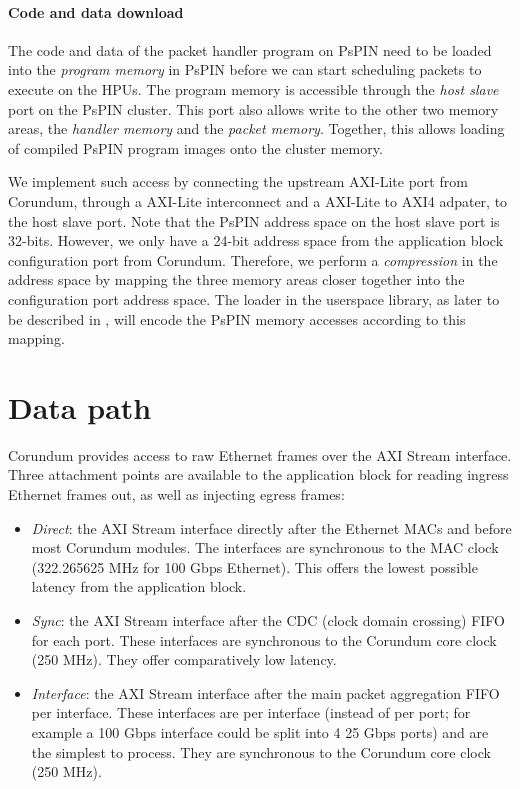 \paragraph{Code and data download} The code and data of the packet handler program on PsPIN need to be loaded into the \emph{program memory} in PsPIN before we can start scheduling packets to execute on the HPUs.  The program memory is accessible through the \emph{host slave} port on the PsPIN cluster.  This port also allows write to the other two memory areas, the \emph{handler memory} and the \emph{packet memory}.  Together, this allows loading of compiled PsPIN program images onto the cluster memory.

We implement such access by connecting the upstream AXI-Lite port from Corundum, through a AXI-Lite interconnect and a AXI-Lite to AXI4 adpater, to the host slave port.  Note that the PsPIN address space on the host slave port is 32-bits.  However, we only have a 24-bit address space from the application block configuration port from Corundum.  Therefore, we perform a \emph{compression} in the address space by mapping the three memory areas closer together into the configuration port address space.  The loader in the userspace library, as later to be described in , will encode the PsPIN memory accesses according to this mapping.

\section{Data path}

Corundum provides access to raw Ethernet frames over the AXI Stream interface.  Three attachment points are available to the application block for reading ingress Ethernet frames out, as well as injecting egress frames:

\begin{itemize}
    \item \emph{Direct}: the AXI Stream interface directly after the Ethernet MACs and before most Corundum modules.  The interfaces are synchronous to the MAC clock (322.265625 MHz for 100 Gbps Ethernet).  This offers the lowest possible latency from the application block.
    \item \emph{Sync}: the AXI Stream interface after the CDC (clock domain crossing) FIFO for each port.  These interfaces are synchronous to the Corundum core clock (250 MHz).  They offer comparatively low latency.
    \item \emph{Interface}: the AXI Stream interface after the main packet aggregation FIFO per interface.  These interfaces are per interface (instead of per port; for example a 100 Gbps interface could be split into 4 25 Gbps ports) and are the simplest to process.  They are synchronous to the Corundum core clock (250 MHz).
\end{itemize}

